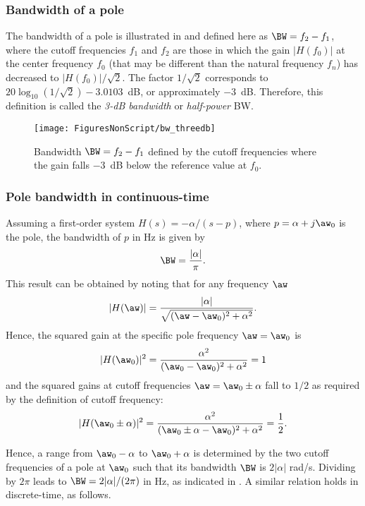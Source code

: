 \subsubsection{Bandwidth of a pole}

The bandwidth of a pole is illustrated in  and defined here as $\BW = f_2 - f_1$, where the cutoff frequencies $f_1$ and $f_2$ are those in which the gain $|H(f_0)|$ at the center frequency $f_0$ (that may be different than the natural frequency $f_n$) has decreased to $|H(f_0)|/\sqrt{2}$. The factor $1/\sqrt{2}$ corresponds to $20 \log_{10}(1/\sqrt{2}) - 3.0103$~dB, or approximately $-3$~dB. Therefore, this definition is called the \emph{3-dB bandwidth} or \emph{half-power} BW.

\begin{figure}
\centering
\texttt{[image: FiguresNonScript/bw\_threedb]}
\caption{Bandwidth $\BW = f_2 - f_1$ defined by the cutoff frequencies where the gain falls $-3$~dB below the reference value at $f_0$.\label{fig:bw_threedb}}
\end{figure}

\subsubsection{Pole bandwidth in continuous-time}
Assuming a first-order system $H(s) = - \alpha / (s - p)$, where $p = \alpha + j \aw_0$ is the pole, the bandwidth of $p$ in Hz is given by
\begin{equation}
\BW = \frac{ |\alpha| }{\pi}.
\label{eq:bw_related_to_radius}
\end{equation}
This result can be obtained by noting that for any frequency $\aw$
\[
|H(\aw)| = \frac{|\alpha|}{ \sqrt{(\aw - \aw_0)^2 + \alpha^2} }.
\]
Hence, the squared gain at the specific pole frequency $\aw = \aw_0$ is
\[
|H(\aw_0)|^2 = \frac{\alpha^2}{ (\aw_0 - \aw_0)^2 + \alpha^2 } = 1
\]
and the squared gains at cutoff frequencies $\aw = \aw_0 \pm \alpha$ fall to $1/2$ as required by the definition of cutoff frequency:
\begin{equation}
|H(\aw_0 \pm \alpha)|^2 = \frac{\alpha^2}{ (\aw_0 \pm \alpha - \aw_0)^2 + \alpha^2 } = \frac{1}{2}.
\label{eq:cutoffOfPole}
\end{equation}

Hence, a range from $\aw_0 - \alpha$ to $\aw_0 + \alpha$ is determined by the two cutoff frequencies of a pole at $\aw_0$ such that its bandwidth $\BW$ is $2 |\alpha|$ rad/s. Dividing by $2\pi$ leads to $\BW = 2 |\alpha| / (2 \pi)$ in Hz, as indicated in .
A similar relation holds in discrete-time, as follows.

